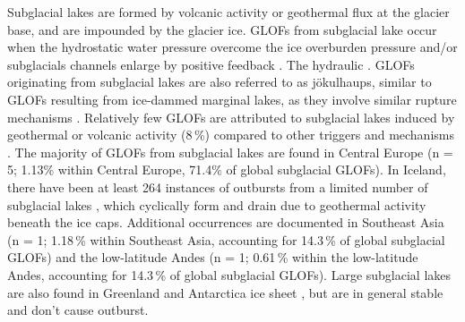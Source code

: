 Subglacial lakes are formed by volcanic activity or geothermal flux at the glacier base, and are impounded by the glacier ice. GLOFs from subglacial lake occur when the hydrostatic water pressure overcome the ice overburden pressure and/or subglacials channels enlarge by positive feedback \citep[][, see also the subsection GLOFs from ice-dammed marginal lakes for a review on the drainage mechanisms]{Bjornsson2010}. The hydraulic . GLOFs originating from subglacial lakes are also referred to as jökulhaups, similar to GLOFs resulting from ice-dammed marginal lakes, as they involve similar rupture mechanisms \citep{Bjornsson2010}. Relatively few GLOFs are attributed to subglacial lakes induced by geothermal or volcanic activity (8\,\%) compared to other triggers and mechanisms \citep{Lutzow&al2023}. The majority of GLOFs from subglacial lakes are found in Central Europe (n = 5; 1.13\% within Central Europe, 71.4\% of global subglacial GLOFs). In Iceland, there have been at least 264 instances of outbursts from a limited number of subglacial lakes \citep{Bjornsson2003}, which cyclically form and drain due to geothermal activity beneath the ice caps. Additional occurrences are documented in Southeast Asia (n = 1; 1.18\,\% within Southeast Asia, accounting for 14.3\,\% of global subglacial GLOFs) and the low-latitude Andes (n = 1; 0.61\,\% within the low-latitude Andes, accounting for 14.3\,\% of global subglacial GLOFs). Large subglacial lakes are also found in Greenland and Antarctica ice sheet \citep{Livingstone&al2022}, but are in general stable and don't cause outburst. 




